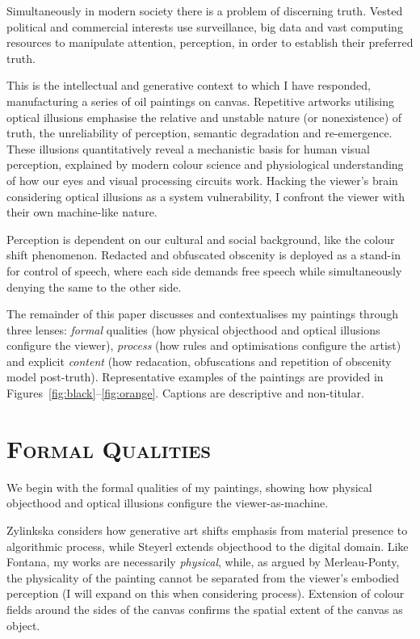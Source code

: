 \documentclass[12pt]{article}
\begin{document}
Simultaneously in modern society there is a problem of discerning
truth.\cite{keyes2004posttruth,mcintyre2018posttruth}  Vested
political and commercial interests use surveillance, big data and vast
computing resources to manipulate attention, perception, in order to
establish their preferred truth.

This is the intellectual and generative context to which I have
responded, manufacturing a series of oil paintings on
canvas. Repetitive artworks utilising optical illusions emphasise the
relative and unstable nature (or nonexistence) of truth, the
unreliability of perception, semantic degradation and
re-emergence. These illusions quantitatively reveal a mechanistic
basis for human visual perception, explained by modern colour science
and physiological understanding of how our eyes and visual processing
circuits work. Hacking the viewer's brain considering optical
illusions as a system vulnerability, I confront the viewer with their
own machine-like nature.

Perception is dependent on our cultural and social background, like
the colour shift phenomenon.  Redacted and obfuscated obscenity is
deployed as a stand-in for control of speech, where each side demands
free speech while simultaneously denying the same to the other side.

The remainder of this paper discusses and contextualises my paintings
through three lenses: \emph{formal} qualities (how physical objecthood
and optical illusions configure the viewer), \emph{process} (how rules
and optimisations configure the artist) and explicit \emph{content}
(how redacation, obfuscations and repetition of obscenity model
post-truth). Representative examples of the paintings are provided in
Figures~\ref{fig:black}--\ref{fig:orange}. Captions are descriptive
and non-titular.

\section{\textsc{Formal Qualities}}
We begin with the formal qualities of my paintings, showing how
physical objecthood and optical illusions configure the
viewer-as-machine.

Zylinkska considers how generative art shifts emphasis from material
presence to algorithmic process,\cite{zylinska2020ai} while Steyerl
extends objecthood to the digital domain.\cite{steyerl2017duty} Like
Fontana, my works are necessarily
\emph{physical},\cite{fontana1947spatial} while, as argued by
Merleau-Ponty, the physicality of the painting cannot be separated
from the viewer's embodied perception (I will expand on this when
considering process).\cite{merleauponty1964eye} Extension of colour
fields around the sides of the canvas confirms the spatial extent of
the canvas as object.
\end{document}
